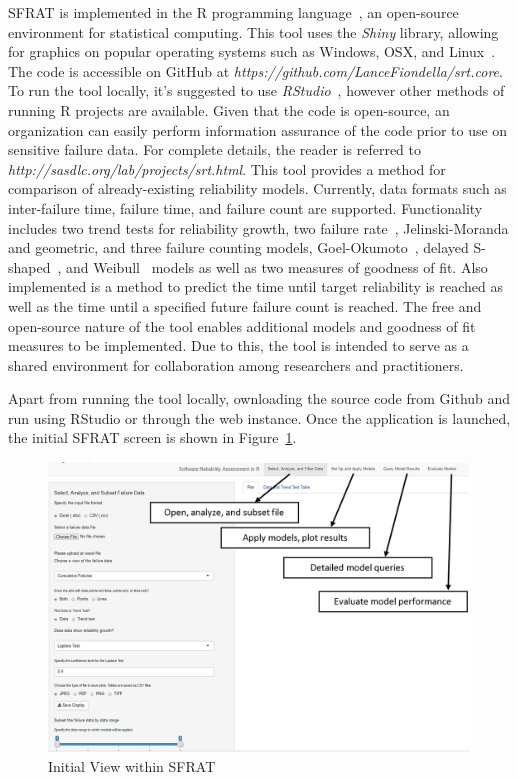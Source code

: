 \documentclass[journal]{IEEEtran}
\begin{document}
SFRAT is implemented in the R programming language~\cite{}, an open-source environment for statistical computing. This tool uses the \textit{Shiny} library, allowing for graphics on popular operating systems such as Windows, OSX, and Linux~\cite{}. The code is accessible on GitHub at \textit{https://github.com/LanceFiondella/srt.core}. To run the tool locally, it's suggested to use \textit{RStudio}~\cite{}, however other methods of running R projects are available. Given that the code is open-source, an organization can easily perform information assurance of the code prior to use on sensitive failure data. For complete details, the reader is referred to \textit{http://sasdlc.org/lab/projects/srt.html}.
This tool provides a method for comparison of already-existing reliability models. Currently, data formats such as inter-failure time, failure time, and failure count are supported. Functionality includes two trend tests for reliability growth, two failure rate~\cite{BookHoSRE}, Jelinski-Moranda and geometric, and three failure counting models, Goel-Okumoto~\cite{goel1985software}, delayed S-shaped~\cite{artTR1986_19}, and Weibull~\cite{artNHPPsurvey} models as well as two measures of goodness of fit. Also implemented is a method to predict the time until target reliability is reached as well as the time until a specified future failure count is reached. The free and open-source nature of the tool enables additional models and goodness of fit measures to be implemented. Due to this, the tool is intended to serve as a shared environment for collaboration among researchers and practitioners.

Apart from running the tool locally, ownloading the source code from Github and run using RStudio or through the web instance. Once the application is launched, the initial SFRAT screen is shown in Figure~\ref{fig_DefaultView}.
\begin{figure}[!h]
\centering
\includegraphics[width=\columnwidth]{Figures/DefaultView}
\caption{Initial View within SFRAT}
\label{fig_DefaultView}
\end{figure}
\end{document}
